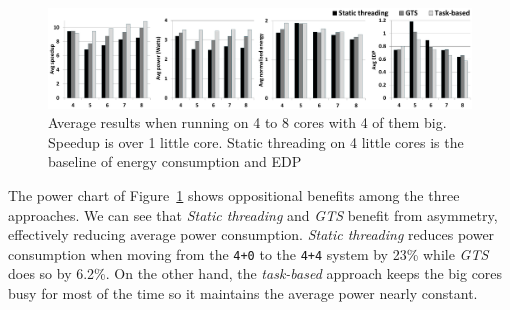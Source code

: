 \begin{figure}[t]%
	\centering
	\includegraphics[width=\textwidth]{figures/averages_4plus_new.pdf}
	\vspace{-0.5cm}
	\caption{Average results when running on 4 to  8 cores with 4 of them big. Speedup is over 1 little core. Static threading on 4 little cores is the baseline of energy consumption and EDP}
	\label{fig:averages4plus}%
	\vspace{-0.3cm}
\end{figure}


The power chart of Figure~\ref{fig:averages4plus} shows oppositional benefits among the three approaches. We can see that \emph{Static threading} and \emph{GTS} benefit from asymmetry, effectively reducing average power consumption.
\emph{Static threading} reduces power consumption when moving from the \texttt{4+0} to the \texttt{4+4} system by 23\% while \emph{GTS} does so by 6.2\%.
On the other hand, the \emph{task-based} approach keeps the big cores busy for most of the time so it maintains the average power nearly constant.



